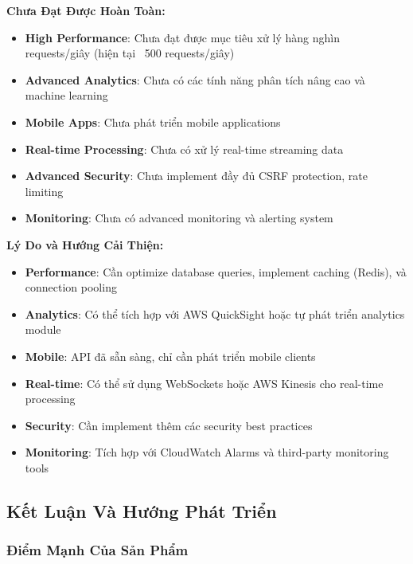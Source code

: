 \textbf{Chưa Đạt Được Hoàn Toàn:}
\begin{itemize}
    \item \textbf{High Performance}: Chưa đạt được mục tiêu xử lý hàng nghìn requests/giây (hiện tại ~500 requests/giây)
    \item \textbf{Advanced Analytics}: Chưa có các tính năng phân tích nâng cao và machine learning
    \item \textbf{Mobile Apps}: Chưa phát triển mobile applications
    \item \textbf{Real-time Processing}: Chưa có xử lý real-time streaming data
    \item \textbf{Advanced Security}: Chưa implement đầy đủ CSRF protection, rate limiting
    \item \textbf{Monitoring}: Chưa có advanced monitoring và alerting system
\end{itemize}

\textbf{Lý Do và Hướng Cải Thiện:}
\begin{itemize}
    \item \textbf{Performance}: Cần optimize database queries, implement caching (Redis), và connection pooling
    \item \textbf{Analytics}: Có thể tích hợp với AWS QuickSight hoặc tự phát triển analytics module
    \item \textbf{Mobile}: API đã sẵn sàng, chỉ cần phát triển mobile clients
    \item \textbf{Real-time}: Có thể sử dụng WebSockets hoặc AWS Kinesis cho real-time processing
    \item \textbf{Security}: Cần implement thêm các security best practices
    \item \textbf{Monitoring}: Tích hợp với CloudWatch Alarms và third-party monitoring tools
\end{itemize}

\subsection{Kết Luận Và Hướng Phát Triển}

\subsubsection{Điểm Mạnh Của Sản Phẩm}

